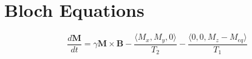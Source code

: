 \section{Bloch Equations}


\begin{displaymath}
  \frac{d\mathbf{M}}{dt} = \gamma \mathbf{M} \times \mathbf{B} - \frac{\langle M_x, M_y, 0 \rangle}{T_2} - \frac{\langle 0, 0, M_z - M_{eq} \rangle}{T_1}
\end{displaymath}





